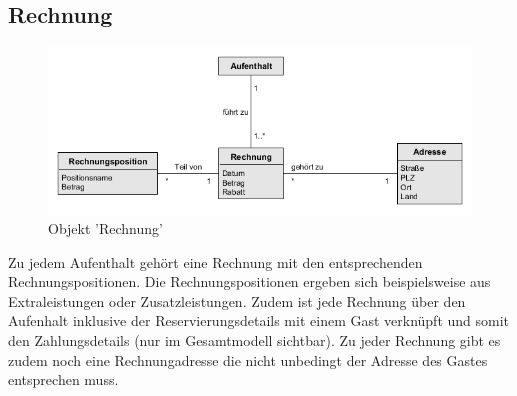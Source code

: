 \documentclass[../../Pflichtenheft.tex]{subfiles}
\begin{document}
    \subsection{Rechnung}
    \begin{figure}[ht!]
        \begin{center}
            \includegraphics[width=0.5\linewidth]{assets/rechnung.png}
            \caption{Objekt 'Rechnung'} \label{rechnung_model}
        \end{center}
    \end{figure}
    Zu jedem Aufenthalt gehört eine Rechnung mit den entsprechenden Rechnungspositionen.
    Die Rechnungspositionen ergeben sich beispielsweise aus Extraleistungen oder Zusatzleistungen.
    Zudem ist jede Rechnung über den Aufenhalt inklusive der Reservierungsdetails mit einem Gast verknüpft und somit den Zahlungsdetails (nur
    im Gesamtmodell sichtbar). Zu jeder Rechnung gibt es zudem noch eine Rechnungadresse die nicht unbedingt
    der Adresse des Gastes entsprechen muss.
\end{document}

